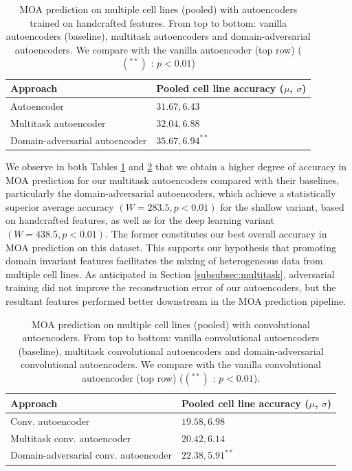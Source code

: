\begin{table}
\begin{tabular}{|l|l|} 
\hline
Approach & Pooled cell line accuracy ($\mu$, $\sigma$) \\ \hline
Autoencoder & $31.67, 6.43$ \\ \hline
Multitask autoencoder & $32.04, 6.88$ \\
Domain-adversarial autoencoder & $\mathbf{35.67, 6.94}^{**}$ \\ \hline
\end{tabular}
\caption{MOA prediction on multiple cell lines (pooled) with autoencoders trained on handcrafted features. From top to bottom: vanilla autoencoders (baseline), multitask autoencoders and domain-adversarial autoencoders. We compare with the vanilla autoencoder (top row) ($(^{**})$ : $p<0.01$)}
\label{table:joint_shallow}
\end{table}



We observe in both Tables \ref{table:joint_shallow} and \ref{table:joint_deep} that we obtain a higher degree of accuracy in MOA prediction for our multitask autoencoders compared with their baselines, particularly the domain-adversarial autoencoders, which achieve a statistically superior average accuracy $(W = 283.5, p < 0.01)$ for the shallow variant, based on handcrafted features, as well as for the deep learning variant $(W = 438.5, p < 0.01)$. The former constitutes our best overall accuracy in MOA prediction on this dataset. This supports our hypothesis that promoting domain invariant features facilitates the mixing of heterogeneous data from multiple cell lines. As anticipated in Section \ref{subsubsec:multitask}, adversarial training did not improve the reconstruction error of our autoencoders, but the resultant features performed better downstream in the MOA prediction pipeline.

\begin{table}
\begin{tabular}{|l|l|}
\hline
Approach & Pooled cell line accuracy ($\mu$, $\sigma$)\\ \hline
Conv. autoencoder & $19.58, 6.98$  \\ \hline
Multitask conv. autoencoder & $20.42, 6.14$ \\
Domain-adversarial conv. autoencoder & $\mathbf{22.38, 5.91}^{**}$ \\ \hline
\end{tabular}
\caption{MOA prediction on multiple cell lines (pooled) with convolutional autoencoders. From top to bottom: vanilla convolutional autoencoders (baseline), multitask convolutional autoencoders and domain-adversarial convolutional autoencoders. We compare with the vanilla convolutional autoencoder (top row) ($(^{**})$ : $p<0.01$).}
\label{table:joint_deep}
\end{table}

